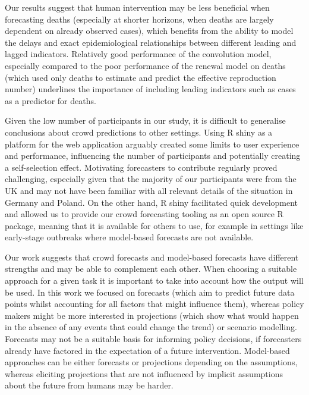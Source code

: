 \documentclass[
]{article}
\begin{document}
Our results suggest that human intervention may be less beneficial when forecasting deaths (especially at shorter horizons, when deaths are largely dependent on already observed cases), which benefits from the ability to model the delays and exact epidemiological relationships between different leading and lagged indicators. Relatively good performance of the convolution model, especially compared to the poor performance of the renewal model on deaths (which used only deaths to estimate and predict the effective reproduction number) underlines the importance of including leading indicators such as cases as a predictor for deaths.

Given the low number of participants in our study, it is difficult to generalise conclusions about crowd predictions to other settings. Using R shiny as a platform for the web application arguably created some limits to user experience and performance, influencing the number of participants and potentially creating a self-selection effect. Motivating forecasters to contribute regularly proved challenging, especially given that the majority of our participants were from the UK and may not have been familiar with all relevant details of the situation in Germany and Poland. On the other hand, R shiny facilitated quick development and allowed us to provide our crowd forecasting tooling as an open source R package, meaning that it is available for others to use, for example in settings like early-stage outbreaks where model-based forecasts are not available.

Our work suggests that crowd forecasts and model-based forecasts have different strengths and may be able to complement each other. When choosing a suitable approach for a given task it is important to take into account how the output will be used. In this work we focused on forecasts (which aim to predict future data points whilst accounting for all factors that might influence them), whereas policy makers might be more interested in projections (which show what would happen in the absence of any events that could change the trend) or scenario modelling. Forecasts may not be a suitable basis for informing policy decisions, if forecasters already have factored in the expectation of a future intervention. Model-based approaches can be either forecasts or projections depending on the assumptions, whereas eliciting projections that are not influenced by implicit assumptions about the future from humans may be harder.
\end{document}
